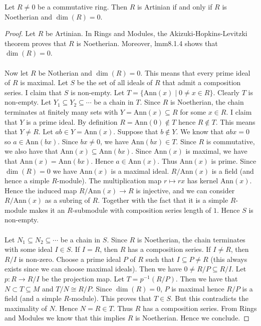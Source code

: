 \documentclass[a4paper]{article}
\begin{document}
\begin{prp}{}{} Let $R\neq 0$ be a commutative ring. Then $R$ is Artinian if and only if $R$ is Noetherian and $\dim(R)=0$. \tcbline
\begin{proof}
Let $R$ be Artinian. In Rings and Modules, the Akizuki-Hopkins-Levitzki theorem proves that $R$ is Noetherian. Moreover, lmm8.1.4 shows that $\dim(R)=0$. \\~\\

Now let $R$ be Notherian and $\dim(R)=0$. This means that every prime ideal of $R$ is maximal. Let $S$ be the set of all ideals of $R$ that admit a composition series. I claim that $S$ is non-empty. Let $T=\{\text{Ann}(x)\;|\;0\neq x\in R\}$. Clearly $T$ is non-empty. Let $Y_1\subseteq Y_2\subseteq\cdots$ be a chain in $T$. Since $R$ is Noetherian, the chain terminates at finitely many sets with $Y=\text{Ann}(x)\subseteq R$ for some $x\in R$. I claim that $Y$ is a prime ideal. By definition $R=\text{Ann}(0)\notin T$ hence $R\notin T$. This means that $Y\neq R$. Let $ab\in Y=\text{Ann}(x)$. Suppose that $b\notin Y$. We know that $abx=0$ so $a\in\text{Ann}(bx)$. Since $bx\neq 0$, we have $\text{Ann}(bx)\in T$. Since $R$ is commutative, we also have that $\text{Ann}(x)\subseteq\text{Ann}(bx)$. Since $\text{Ann}(x)$ is maximal, we have that $\text{Ann}(x)=\text{Ann}(bx)$. Hence $a\in\text{Ann}(x)$. Thus $\text{Ann}(x)$ is prime. Since $\dim(R)=0$ we have $\text{Ann}(x)$ is a maximal ideal. $R/\text{Ann}(x)$ is a field (and hence a simple $R$-module). The multiplication map $r\mapsto rx$ has kernel $\text{Ann}(x)$. Hence the induced map $R/\text{Ann}(x)\to R$ is injective, and we can consider $R/\text{Ann}(x)$ as a subring of $R$. Together with the fact that it is a simple $R$-module makes it an $R$-submodule with composition series length of $1$. Hence $S$ is non-empty. \\~\\

Let $N_1\subseteq N_2\subseteq\cdots$ be a chain in $S$. Since $R$ is Noetherian, the chain terminates with some ideal $I\in S$. If $I=R$, then $R$ has a composition series. If $I\neq R$, then $R/I$ is non-zero. Choose a prime ideal $P$ of $R$ such that $I\subseteq P\neq R$ (this always exists since we can choose maximal ideals). Then we have $0\neq R/P\subseteq R/I$. Let $p:R\to R/I$ be the projection map. Let $T=p^{-1}(R/P)$. Then we have that $N\subset T\subseteq M$ and $T/N\cong R/P$. Since $\dim(R)=0$, $P$ is maximal hence $R/P$ is a field (and a simple $R$-module). This proves that $T\in S$. But this contradicts the maximality of $N$. Hence $N=R\in T$. Thus $R$ has a composition series. From Rings and Modules we know that this implies $R$ is Noetherian. Hence we conclude. 
\end{proof}
\end{prp}
\end{document}
